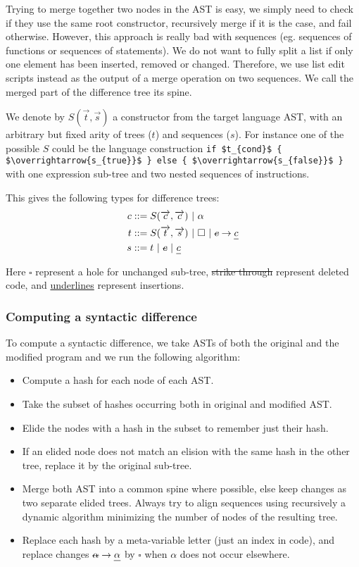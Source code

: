 \documentclass[a4paper,10pt]{article}
\newcommand{\typsep}{\ |\ }
\begin{document}
Trying to merge together two nodes in the AST is easy, we simply need to check if they use the same root constructor, recursively merge if it is the case, and fail otherwise. However, this approach is really bad with sequences (eg. sequences of functions or sequences of statements). We do not want to fully split a list if only one element has been inserted, removed or changed. Therefore, we use list edit scripts instead as the output of a merge operation on two sequences. We call the merged part of the difference tree its spine.

We denote by $S(\overrightarrow{t}, \overrightarrow{s})$ a constructor from the target language AST, with an arbitrary but fixed arity of trees ($t$) and sequences ($s$). For instance one of the possible $S$ could be the language construction \lstinline[mathescape]|if $t_{cond}$ { $\overrightarrow{s_{true}}$ } else { $\overrightarrow{s_{false}}$ }| with one expression sub-tree and two nested sequences of instructions.

This gives the following types for difference trees:
\begin{align*}
c &::= S(\overrightarrow{c}, \overrightarrow{c}) \typsep \alpha\\
t &::= S(\overrightarrow{t}, \overrightarrow{s}) \typsep \square \typsep \text{\st{$c$}} \rightarrow \text{\ul{$c$}}\\
s &::= t \typsep \text{\st{$c$}} \typsep \text{\ul{$c$}}\\
\end{align*}

Here $\square$ represent a hole for unchanged sub-tree, \st{strike through} represent deleted code, and \ul{underlines} represent insertions.

\subsubsection{Computing a syntactic difference}
To compute a syntactic difference, we take ASTs of both the original and the modified program and we run the following algorithm:
\begin{itemize}
  \item Compute a hash for each node of each AST.
  \item Take the subset of hashes occurring both in original and modified AST.
  \item Elide the nodes with a hash in the subset to remember just their hash.
  \item If an elided node does not match an elision with the same hash in the other tree, replace it by the original sub-tree.
  \item Merge both AST into a common spine where possible, else keep changes as two separate elided trees. Always try to align sequences using recursively a dynamic algorithm minimizing the number of nodes of the resulting tree.
  \item Replace each hash by a meta-variable letter (just an index in code), and replace changes $\text{\st{$\alpha$}} \rightarrow \text{\ul{$\alpha$}}$ by $\square$ when $\alpha$ does not occur elsewhere.
\end{itemize}
\end{document}
